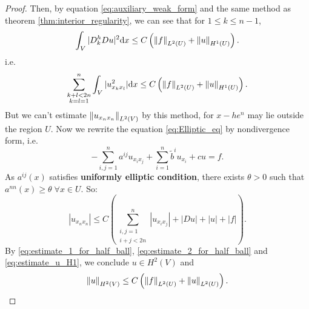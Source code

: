 \begin{proof}
    Then, by equation \eqref{eq:auxiliary_weak_form} and the same method as theorem \ref{thm:interior_regularity}, we can see that for $1\le k\le n-1$, 
    \begin{equation}
        \int_{V}|D_{k}^{h}Du|^{2}\mathrm{d} x\le C\left(\left\|f\right\|_{L^{2}(U)}+\left\|u\right\|_{H^{1}(U)}\right).
    \end{equation}
    i.e.
    \begin{equation}
        \label{eq:estimate_1_for_half_ball}
        \sum_{\substack{k+l<2n\\k=l=1}}^{n}\int_{V}|u_{x_{k}x_{l}}^{2}|\mathrm{d} x\le C\left(\left\|f\right\|_{L^{2}(U)}+\left\|u\right\|_{H^{1}(U)}\right).
    \end{equation}
    But we can't estimate $\left\|u_{x_{n}x_{n}}\right\|_{L^{2}(V)}$ by this method, for $x-he^{n}$ may lie outside the region $U$. Now we rewrite the equation \eqref{eq:Elliptic_eq} by nondivergence form, i.e.
    \begin{equation}
        -\sum_{i,j=1}^{n}a^{ij}u_{x_{i}x_{j}}+\sum_{i=1}^{n}\tilde{b}^{i}u_{x_{i}}+cu=f.
    \end{equation}
    As $a^{ij}(x)$ satisfies \textbf{uniformly elliptic condition}, there exists $\theta>0$ such that $a^{nn}(x)\ge \theta\;\forall x\in U$. So:
    \begin{equation}
        \label{eq:estimate_2_for_half_ball}
        |u_{x_{n}x_{n}}|\le C\left(\sum_{\substack{i,j=1\\i+j<2n}}^{n}|u_{x_{i}x_{j}}|+|Du|+|u|+|f|\right).
    \end{equation}
    By \eqref{eq:estimate_1_for_half_ball}, \eqref{eq:estimate_2_for_half_ball} and \eqref{eq:estimate_u_H1}, we conclude $u\in H^{2}(V)$ and 
    \begin{equation}
        \label{eq:estimate_on_half_ball}
        \left\|u\right\|_{H^{2}(V)}\le C\left(\left\|f\right\|_{L^{2}(U)}+\left\|u\right\|_{L^{2}(U)}\right).
    \end{equation}


\end{proof}
